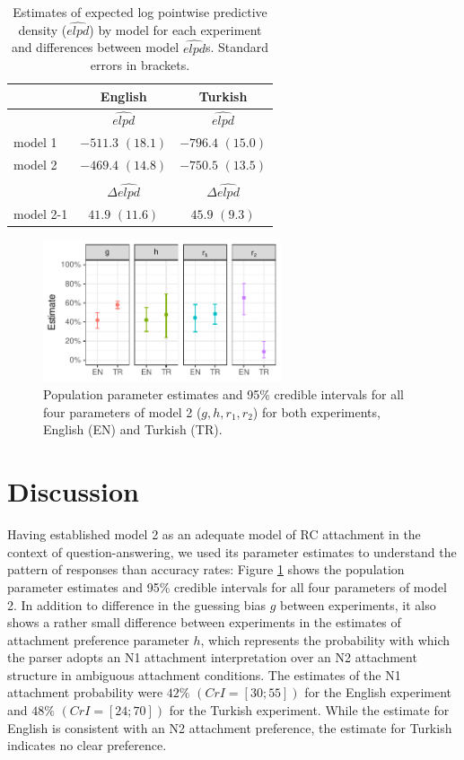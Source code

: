 \documentclass[11pt]{article}\usepackage[]{graphicx}\usepackage[]{color}
\begin{document}
\begin{table}
\centering
\begin{tabular}{lcc}
\hline
        & English & Turkish \\
\hline
        & $\widehat{elpd}$ & $\widehat{elpd}$ \\
\hline
model 1 & $-511.3$ $(18.1)$ & $-796.4$ $(15.0)$ \\
model 2 & $-469.4$ $(14.8)$ & $-750.5$ $(13.5)$ \\
\hline
 &  &  \\
 & $\Delta\widehat{elpd}$ & $\Delta\widehat{elpd}$ \\
\hline
model 2-1 & $41.9$ $(11.6)$ & $45.9$ $(9.3)$
\end{tabular}
\caption{Estimates of expected log pointwise predictive density ($\widehat{elpd}$) by model for each experiment and differences between model $\widehat{elpd}$s. Standard errors in brackets. }
\label{tab:model_comp}
\end{table}


\begin{figure}
\includegraphics[width=7cm]{../figures/estimates_r1r2hg.pdf}
\caption{Population parameter estimates and 95\% credible intervals for all four parameters of model 2 ($g, h, r_1, r_2$) for both experiments, English (EN) and Turkish (TR). }
\label{estimates_r1r2hg}
\end{figure}


\section{Discussion}

Having established model 2 as an adequate model of RC attachment in the context of question-answering, we used its parameter estimates to understand the pattern of responses than accuracy rates: Figure \ref{estimates_r1r2hg} shows the population parameter estimates and 95\% credible intervals for all four parameters of model 2. In addition to difference in the guessing bias $g$ between experiments, it also shows a rather small difference between experiments in the estimates of attachment preference parameter $h$, which represents the probability with which the parser adopts an N1 attachment interpretation over an N2 attachment structure in ambiguous attachment conditions. The estimates of the N1 attachment probability were $42\%$ $(CrI=[30; 55])$ for the English experiment and $48\%$ $(CrI=[24; 70])$ for the Turkish experiment. While the estimate for English is consistent with an N2 attachment preference, the estimate for Turkish indicates no clear preference.
\end{document}
